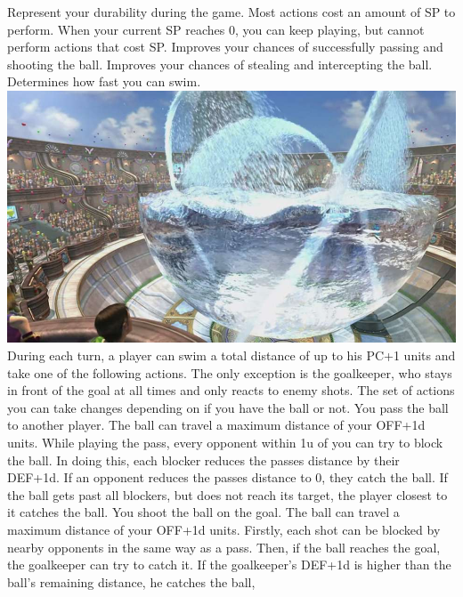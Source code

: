  Represent your durability during the game. 
	Most actions cost an amount of SP to perform. 
	When your current SP reaches 0, you can keep playing, but 
	cannot perform actions that cost SP.
%
\ofrow
%
 Improves your chances of successfully passing and shooting the ball.\ofrow
{} Improves your chances of stealing and intercepting the ball.\ofrow
{} Determines how fast you can swim.
%
\newpage
%
%
\includegraphics[width=\columnwidth]{./art/blitz/stadium.jpg}
%
\vfill
%
During each turn, a player can swim a total distance of up to his PC+1 units and take one of the following actions.
The only exception is the goalkeeper, who stays in front of the goal at all times and only reacts to enemy shots.
The set of actions you can take changes depending on if you have the ball or not.
%
\ofrow
%
 You pass the ball to another player.
The ball can travel a maximum distance of your OFF+1d units.
While playing the pass, every opponent within 1u of you can try to block the ball.
In doing this, each blocker reduces the passes distance by their DEF+1d.
If an opponent reduces the passes distance to 0, they catch the ball.
If the ball gets past all blockers, but does not reach its target, the player closest to it
catches the ball.
%	
\ofrow
%
 You shoot the ball on the goal. 
The ball can travel a maximum distance of your OFF+1d units.
Firstly, each shot can be blocked by nearby opponents in the same way as a pass.
Then, if the ball reaches the goal, the goalkeeper can try to catch it.
If the goalkeeper's DEF+1d is higher than the ball's remaining distance, he catches the ball,
